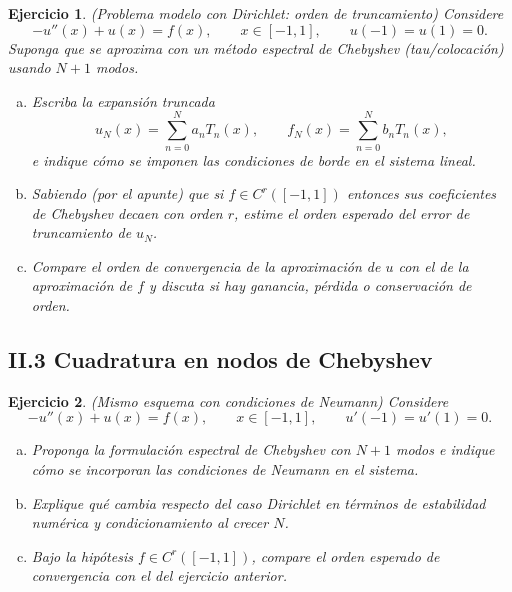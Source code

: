 \documentclass[12pt]{article}
\newtheorem{exercise}{Ejercicio}
\newcommand{\bej}{\begin{exercise}\rm}
\newcommand{\fej}{\end{exercise}}
\begin{document}
\bej
(Problema modelo con Dirichlet: orden de truncamiento)
Considere
\[
-u''(x)+u(x)=f(x),\qquad x\in[-1,1],
\qquad
u(-1)=u(1)=0.
\]
Suponga que se aproxima con un método espectral de Chebyshev (tau/colocación) usando $N+1$ modos.
\begin{enumerate}[(a)]
    \item Escriba la expansión truncada
    \[
    u_N(x)=\sum_{n=0}^{N} a_n T_n(x),
    \qquad
    f_N(x)=\sum_{n=0}^{N} b_n T_n(x),
    \]
    e indique cómo se imponen las condiciones de borde en el sistema lineal.
    \item Sabiendo (por el apunte) que si $f\in C^r([-1,1])$ entonces sus coeficientes de Chebyshev decaen con orden $r$, estime el orden esperado del error de truncamiento de $u_N$.
    \item Compare el orden de convergencia de la aproximación de $u$ con el de la aproximación de $f$ y discuta si hay ganancia, pérdida o conservación de orden.
\end{enumerate}
\fej

\subsection*{II.3 Cuadratura en nodos de Chebyshev}

\bej
(Mismo esquema con condiciones de Neumann)
Considere
\[
-u''(x)+u(x)=f(x),\qquad x\in[-1,1],
\qquad
u'(-1)=u'(1)=0.
\]
\begin{enumerate}[(a)]
    \item Proponga la formulación espectral de Chebyshev con $N+1$ modos e indique cómo se incorporan las condiciones de Neumann en el sistema.
    \item Explique qué cambia respecto del caso Dirichlet en términos de estabilidad numérica y condicionamiento al crecer $N$.
    \item Bajo la hipótesis $f\in C^r([-1,1])$, compare el orden esperado de convergencia con el del ejercicio anterior.
\end{enumerate}
\fej
\end{document}
